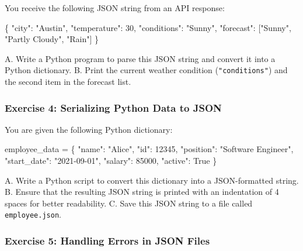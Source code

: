 \documentclass[
  letterpaper,
  DIV=11,
  numbers=noendperiod]{scrreprt}
\newenvironment{Shaded}{\begin{snugshade}}{\end{snugshade}}
\newcommand{\DataTypeTok}[1]{\textcolor[rgb]{0.68,0.00,0.00}{#1}}
\newcommand{\DecValTok}[1]{\textcolor[rgb]{0.68,0.00,0.00}{#1}}
\newcommand{\FunctionTok}[1]{\textcolor[rgb]{0.28,0.35,0.67}{#1}}
\newcommand{\NormalTok}[1]{\textcolor[rgb]{0.00,0.23,0.31}{#1}}
\newcommand{\OperatorTok}[1]{\textcolor[rgb]{0.37,0.37,0.37}{#1}}
\newcommand{\OtherTok}[1]{\textcolor[rgb]{0.00,0.23,0.31}{#1}}
\newcommand{\StringTok}[1]{\textcolor[rgb]{0.13,0.47,0.30}{#1}}
\newcommand{\VariableTok}[1]{\textcolor[rgb]{0.07,0.07,0.07}{#1}}
\begin{document}
You receive the following JSON string from an API response:

\begin{Shaded}
\begin{Highlighting}[]
\FunctionTok{\{}
    \DataTypeTok{"city"}\FunctionTok{:} \StringTok{"Austin"}\FunctionTok{,}
    \DataTypeTok{"temperature"}\FunctionTok{:} \DecValTok{30}\FunctionTok{,}
    \DataTypeTok{"conditions"}\FunctionTok{:} \StringTok{"Sunny"}\FunctionTok{,}
    \DataTypeTok{"forecast"}\FunctionTok{:} \OtherTok{[}\StringTok{"Sunny"}\OtherTok{,} \StringTok{"Partly Cloudy"}\OtherTok{,} \StringTok{"Rain"}\OtherTok{]}
\FunctionTok{\}}
\end{Highlighting}
\end{Shaded}

A. Write a Python program to parse this JSON string and convert it into
a Python dictionary. B. Print the current weather condition
(\texttt{"conditions"}) and the second item in the forecast list.

\hypertarget{exercise-4-serializing-python-data-to-json}{%
\subsubsection{Exercise 4: Serializing Python Data to
JSON}\label{exercise-4-serializing-python-data-to-json}}

You are given the following Python dictionary:

\begin{Shaded}
\begin{Highlighting}[]
\NormalTok{employee\_data }\OperatorTok{=}\NormalTok{ \{}
    \StringTok{"name"}\NormalTok{: }\StringTok{"Alice"}\NormalTok{,}
    \StringTok{"id"}\NormalTok{: }\DecValTok{12345}\NormalTok{,}
    \StringTok{"position"}\NormalTok{: }\StringTok{"Software Engineer"}\NormalTok{,}
    \StringTok{"start\_date"}\NormalTok{: }\StringTok{"2021{-}09{-}01"}\NormalTok{,}
    \StringTok{"salary"}\NormalTok{: }\DecValTok{85000}\NormalTok{,}
    \StringTok{"active"}\NormalTok{: }\VariableTok{True}
\NormalTok{\}}
\end{Highlighting}
\end{Shaded}

A. Write a Python script to convert this dictionary into a
JSON-formatted string. B. Ensure that the resulting JSON string is
printed with an indentation of 4 spaces for better readability. C. Save
this JSON string to a file called \texttt{employee.json}.

\hypertarget{exercise-5-handling-errors-in-json-files}{%
\subsubsection{Exercise 5: Handling Errors in JSON
Files}\label{exercise-5-handling-errors-in-json-files}}
\end{document}
